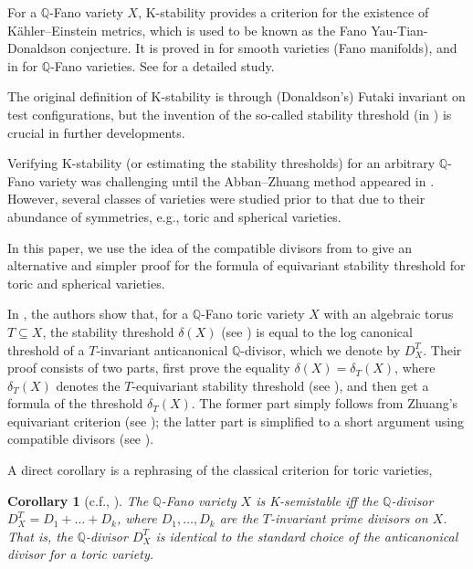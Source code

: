 \documentclass[11pt, oneside]{amsart}
\newtheorem{corollary}[theorem]{Corollary}
\newcommand{\<}{\left\langle} \renewcommand{\>}{\right\rangle}
\begin{document}
\newcommand{\lct}{\mathrm{lct}}

For a $\mathbb{Q}$-Fano variety $X$, K-stability provides a criterion for the existence of Kähler--Einstein metrics, which is used to be known as the Fano Yau-Tian-Donaldson conjecture.
% 
It is proved in \cite{CDS_KE_Fano} for smooth varieties (Fano manifolds), and in \cite{Berman_Kps_QFano_KE, LXZ_fg_val_compu_thre} for $\mathbb{Q}$-Fano varieties. See \cite{Xu_Book} for a detailed study.

The original definition of K-stability is through (Donaldson's) Futaki invariant on test configurations, but the invention of the so-called stability threshold (in \cite{FO_Kst_Kano,BJ_thre_val_kst}) is crucial in further developments.

Verifying K-stability (or estimating the stability thresholds) for an arbitrary $\mathbb{Q}$-Fano variety was challenging until the Abban--Zhuang method appeared in \cite{AZ_Kstab_fano_flag}. However, several classes of varieties were studied prior to that due to their abundance of symmetries, e.g., toric and spherical varieties.

In this paper, we use the idea of the compatible divisors from \cite{AZ_Kstab_fano_flag} to give an alternative and simpler proof for the formula of equivariant stability threshold for toric and spherical varieties.

In \cite{BJ_thre_val_kst}, the authors show that, for a $\mathbb{Q}$-Fano toric variety $X$ with an algebraic torus $T \subseteq X$, the stability threshold $\delta(X)$ (see ) is equal to the log canonical threshold of a $T$-invariant anticanonical $\mathbb{Q}$-divisor, which we denote by $D^T_X$.
% 
Their proof consists of two parts, first prove the equality $\delta(X) = \delta_T(X)$, where $\delta_T(X)$ denotes the $T$-equivariant stability threshold (see ), and then get a formula of the threshold $\delta_T(X)$.
% 
The former part simply follows from Zhuang's equivariant criterion \cite{Zhuang_equi_Kst} (see ); the latter part is simplified to a short argument using compatible divisors (see ).


A direct corollary is a rephrasing of the classical criterion for toric varieties,
\begin{corollary}[c.f., ]
	The $\mathbb{Q}$-Fano variety $X$ is K-semistable iff the $\mathbb{Q}$-divisor $D^T_X = D_1 + \dots + D_k$, where $D_1, \dots, D_k$ are the $T$-invariant prime divisors on $X$. That is, the $\mathbb{Q}$-divisor $D^T_X$ is identical to the standard choice of the anticanonical divisor for a toric variety.
\end{corollary}
\end{document}
